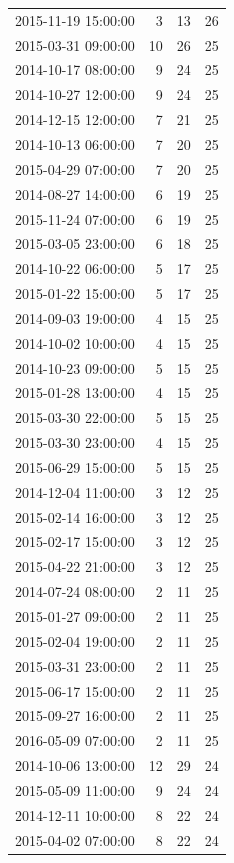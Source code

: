 \begin{tabular}{lrrr}
2015-11-19 15:00:00 & 3 & 13 & 26 \\
2015-03-31 09:00:00 & 10 & 26 & 25 \\
2014-10-17 08:00:00 & 9 & 24 & 25 \\
2014-10-27 12:00:00 & 9 & 24 & 25 \\
2014-12-15 12:00:00 & 7 & 21 & 25 \\
2014-10-13 06:00:00 & 7 & 20 & 25 \\
2015-04-29 07:00:00 & 7 & 20 & 25 \\
2014-08-27 14:00:00 & 6 & 19 & 25 \\
2015-11-24 07:00:00 & 6 & 19 & 25 \\
2015-03-05 23:00:00 & 6 & 18 & 25 \\
2014-10-22 06:00:00 & 5 & 17 & 25 \\
2015-01-22 15:00:00 & 5 & 17 & 25 \\
2014-09-03 19:00:00 & 4 & 15 & 25 \\
2014-10-02 10:00:00 & 4 & 15 & 25 \\
2014-10-23 09:00:00 & 5 & 15 & 25 \\
2015-01-28 13:00:00 & 4 & 15 & 25 \\
2015-03-30 22:00:00 & 5 & 15 & 25 \\
2015-03-30 23:00:00 & 4 & 15 & 25 \\
2015-06-29 15:00:00 & 5 & 15 & 25 \\
2014-12-04 11:00:00 & 3 & 12 & 25 \\
2015-02-14 16:00:00 & 3 & 12 & 25 \\
2015-02-17 15:00:00 & 3 & 12 & 25 \\
2015-04-22 21:00:00 & 3 & 12 & 25 \\
2014-07-24 08:00:00 & 2 & 11 & 25 \\
2015-01-27 09:00:00 & 2 & 11 & 25 \\
2015-02-04 19:00:00 & 2 & 11 & 25 \\
2015-03-31 23:00:00 & 2 & 11 & 25 \\
2015-06-17 15:00:00 & 2 & 11 & 25 \\
2015-09-27 16:00:00 & 2 & 11 & 25 \\
2016-05-09 07:00:00 & 2 & 11 & 25 \\
2014-10-06 13:00:00 & 12 & 29 & 24 \\
2015-05-09 11:00:00 & 9 & 24 & 24 \\
2014-12-11 10:00:00 & 8 & 22 & 24 \\
2015-04-02 07:00:00 & 8 & 22 & 24 \\

\end{tabular}
